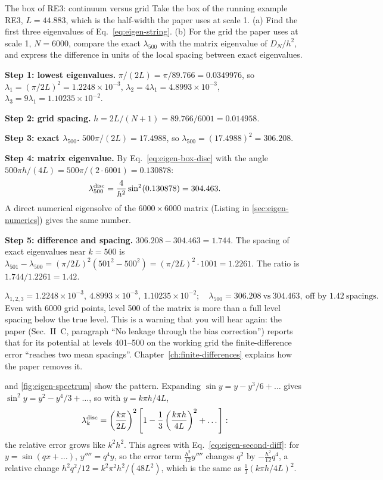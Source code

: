 \begin{sample}{The box of RE3: continuum versus grid}
Take the box of the running example RE3, $L=44.883$, which is the half-width the paper uses at scale 1. (a) Find the first three eigenvalues of Eq.~\eqref{eq:eigen-string}. (b) For the grid the paper uses at scale 1, $N=6000$, compare the exact $\lambda_{500}$ with the matrix eigenvalue of $D_N/h^2$, and express the difference in units of the local spacing between exact eigenvalues.

\textbf{Step 1: lowest eigenvalues.} $\pi/(2L)=\pi/89.766=0.0349976$, so $\lambda_1=(\pi/2L)^2=1.2248\times10^{-3}$, $\lambda_2=4\lambda_1=4.8993\times10^{-3}$, $\lambda_3=9\lambda_1=1.10235\times10^{-2}$.

\textbf{Step 2: grid spacing.} $h=2L/(N+1)=89.766/6001=0.014958$.

\textbf{Step 3: exact $\lambda_{500}$.} $500\pi/(2L)=17.4988$, so $\lambda_{500}=(17.4988)^2=306.208$.

\textbf{Step 4: matrix eigenvalue.} By Eq.~\eqref{eq:eigen-box-disc} with the angle $500\pi h/(4L)=500\pi/(2\cdot6001)=0.130878$:
\[
\lambda_{500}^{\rm disc}=\frac{4}{h^2}\sin^2(0.130878)=304.463.
\]
A direct numerical eigensolve of the $6000\times6000$ matrix (Listing in \cref{sec:eigen-numerics}) gives the same number.

\textbf{Step 5: difference and spacing.} $306.208-304.463=1.744$. The spacing of exact eigenvalues near $k=500$ is $\lambda_{501}-\lambda_{500}=(\pi/2L)^2(501^2-500^2)=(\pi/2L)^2\cdot1001=1.2261$. The ratio is $1.744/1.2261=1.42$.

\[
\boxed{\lambda_{1,2,3}=1.2248\times10^{-3},\ 4.8993\times10^{-3},\ 1.10235\times10^{-2};\quad \lambda_{500}=306.208\ \text{vs}\ 304.463,\ \text{off by }1.42\ \text{spacings}.}
\]
Even with 6000 grid points, level 500 of the matrix is more than a full level spacing below the true level. This is a warning that you will hear again: the paper (Sec.~II~C, paragraph ``No leakage through the bias correction'') reports that for its potential at levels 401--500 on the working grid the finite-difference error ``reaches two mean spacings''. Chapter~\ref{ch:finite-differences} explains how the paper removes it.
\end{sample}

 and \cref{fig:eigen-spectrum} show the pattern. Expanding $\sin y=y-y^3/6+\dots$ gives $\sin^2y=y^2-y^4/3+\dots$, so with $y=k\pi h/4L$,
\begin{equation}
\lambda_k^{\rm disc}=\left(\frac{k\pi}{2L}\right)^2\left[1-\frac13\left(\frac{k\pi h}{4L}\right)^2+\dots\right]:
\end{equation}
the relative error grows like $k^2h^2$. This agrees with Eq.~\eqref{eq:eigen-second-diff}: for $y=\sin(qx+\dots)$, $y''''=q^4y$, so the error term $\tfrac{h^2}{12}y''''$ changes $q^2$ by $-\tfrac{h^2}{12}q^4$, a relative change $h^2q^2/12=k^2\pi^2h^2/(48L^2)$, which is the same as $\tfrac13(k\pi h/4L)^2$.

